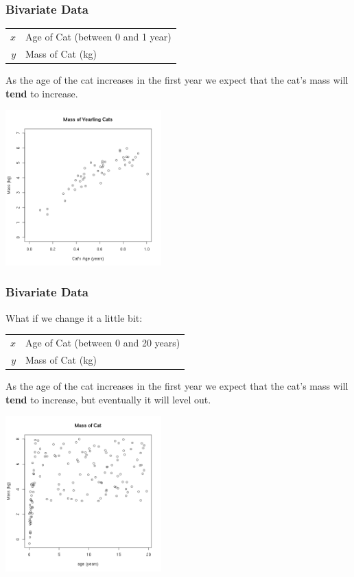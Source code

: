 \begin{frame}
  \frametitle{Bivariate Data}

  \begin{tabular}{r@{~$=$~}l}
    $x$ & Age of Cat (between 0 and 1 year)  \\
    $y$ & Mass of Cat (kg)
  \end{tabular}
  
  \vfill

  {

    As the age of the cat increases in the first year we expect that
    the cat's mass will \textbf{tend} to increase.

  }

  {
    \includegraphics[width=6cm]{img/catsmass}
  }

  \vfill


\end{frame}


\begin{frame}
  \frametitle{Bivariate Data}

  What if we change it a little bit: \\
  \begin{tabular}{r@{~$=$~}l}
    $x$ & Age of Cat (between 0 and 20 years)  \\
    $y$ & Mass of Cat (kg)
  \end{tabular}
  
  \vfill

  {

    As the age of the cat increases in the first year we expect that
    the cat's mass will \textbf{tend} to increase, but eventually it
    will level out.

  }

  {
    \includegraphics[width=6cm]{img/catsmassLater}
  }

  \vfill


\end{frame}


